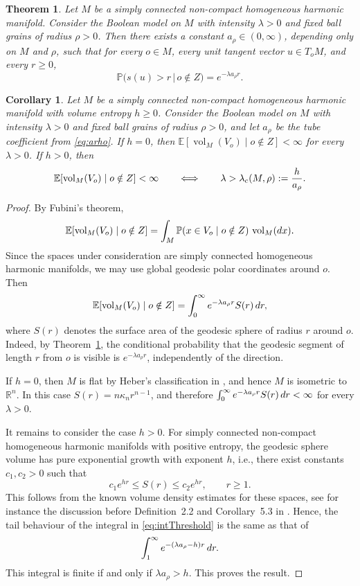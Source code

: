 \documentclass[10pt,a4paper]{amsart}
\newtheorem{theorem}{Theorem}
\newtheorem{corollary}{Corollary}
\def\EE{\mathbb{E}}
\def\PP{\mathbb{P}}
\def\RR{\mathbb{R}}
\newcommand{\dint}{\textup{d}}
\newcommand{\vol}{\mathop{\mathrm{vol}}\nolimits}
\begin{document}
\begin{theorem}\label{thm:exp_visibility_harmonic}
	Let \(M\) be a simply connected non-compact homogeneous harmonic manifold.
	Consider the Boolean model on \(M\) with intensity \(\lambda>0\) and fixed
	ball grains of radius \(\rho>0\). Then there exists a constant
	\(a_\rho\in(0,\infty)\), depending only on \(M\) and \(\rho\), such that
	for every \(o\in M\), every unit tangent vector \(u\in T_oM\), and every
	\(r\geq 0\),
	\[
	\PP\bigl(s(u)>r\,\big|\,o\notin Z\bigr)
	=
	e^{-\lambda a_\rho r}.
	\]
\end{theorem}

\begin{corollary}\label{cor}
	Let \(M\) be a simply connected non-compact homogeneous harmonic manifold
	with volume entropy \(h\geq 0\). Consider the Boolean model on \(M\) with
	intensity \(\lambda>0\) and fixed ball grains of radius \(\rho>0\), and let
	\(a_\rho\) be the tube coefficient from \eqref{eq:arho}. If \(h=0\), then $\EE[\vol_M(V_o)\mid o\notin Z]<\infty$ for every $\lambda>0$.
	If \(h>0\), then
	\[
	\EE[\vol_M(V_o)\mid o\notin Z]<\infty
	\qquad\Longleftrightarrow\qquad
	\lambda>\lambda_c(M,\rho):={h\over a_\rho}.
	\]
\end{corollary}

\begin{proof}
	By Fubini's theorem,
	\[
	\EE[\vol_M(V_o)\mid o\notin Z]
	=
	\int_M
	\PP(x\in V_o\mid o\notin Z)\,\vol_M(\dint x).
	\]
	Since the spaces
	under consideration are simply connected homogeneous harmonic manifolds, we may
	use global geodesic polar coordinates around \(o\). Then
	\begin{equation}\label{eq:intThreshold}
	\EE[\vol_M(V_o)\mid o\notin Z]
	=
	\int_0^\infty
	e^{-\lambda a_\rho r}S(r)\,\dint r,
	\end{equation}
	where \(S(r)\) denotes the surface area of the
	geodesic sphere of radius \(r\) around \(o\). Indeed, by
	Theorem~\ref{thm:exp_visibility_harmonic}, the conditional probability that
	the geodesic segment of length \(r\) from \(o\) is visible is
	\(e^{-\lambda a_\rho r}\), independently of the direction.
	
	If \(h=0\), then \(M\) is flat by Heber's classification in \cite{HeberHarmonicHomogeneous}, and hence
	\(M\) is isometric to \(\RR^n\). In this case $S(r)=n\kappa_n r^{n-1}$,
	and therefore $\int_0^\infty e^{-\lambda a_\rho r}S(r)\,\dint r<\infty$ for every \(\lambda>0\).
	
	It remains to consider the case \(h>0\). For simply connected non-compact
	homogeneous harmonic manifolds with positive entropy, the geodesic sphere
	volume has pure exponential growth with exponent \(h\), i.e., there exist
	constants \(c_1,c_2>0\) such that
	\[
	c_1e^{hr}\leq S(r)\leq c_2e^{hr},
	\qquad r\geq 1.
	\]
	This follows from the known volume density estimates for these spaces, see
	for instance the discussion before Definition~2.2 and Corollary~5.3 in
	\cite{Knieper12}. Hence, the tail behaviour of the integral in \eqref{eq:intThreshold} is the same as that of
	\[
	\int_{1}^\infty e^{-(\lambda a_\rho-h)r}\,\dint r.
	\]
	This integral is finite if and only if \(\lambda a_\rho>h\). This proves the result.
\end{proof}
\end{document}
